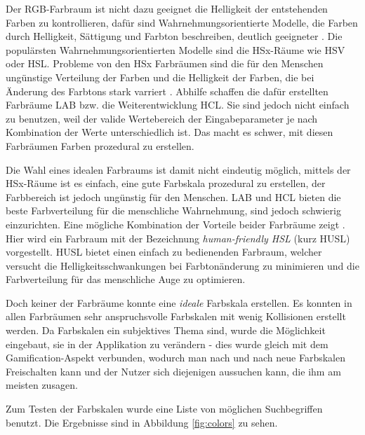 \documentclass[12pt,twoside]{book}
\begin{document}
Der RGB-Farbraum ist nicht dazu geeignet die Helligkeit der entstehenden Farben zu kontrollieren, dafür sind Wahrnehmungsorientierte Modelle, die Farben durch Helligkeit, Sättigung und Farbton beschreiben, deutlich geeigneter \cite{meier2004interactive}. Die populärsten Wahrnehmungsorientierten Modelle sind die HSx-Räume wie HSV oder HSL.
Probleme von den HSx Farbräumen sind die für den Menschen ungünstige Verteilung der Farben und die Helligkeit der Farben, die bei Änderung des Farbtons stark varriert \cite{husl}.
Abhilfe schaffen die dafür erstellten Farbräume LAB bzw. die Weiterentwicklung HCL. Sie sind jedoch nicht einfach zu benutzen, weil der valide Wertebereich der Eingabeparameter je nach Kombination der Werte unterschiedlich ist. Das macht es schwer, mit diesen Farbräumen Farben prozedural zu erstellen.

Die Wahl eines idealen Farbraums ist damit nicht eindeutig möglich, mittels der HSx-Räume ist es einfach, eine gute Farbskala prozedural zu erstellen, der Farbbereich ist jedoch ungünstig für den Menschen. LAB und HCL bieten die beste Farbverteilung für die menschliche Wahrnehmung, sind jedoch schwierig einzurichten. Eine mögliche Kombination der Vorteile beider Farbräume zeigt \citep{husl}. Hier wird ein Farbraum mit der Bezeichnung \textit{human-friendly HSL} (kurz HUSL) vorgestellt. HUSL bietet einen einfach zu bedienenden Farbraum, welcher versucht die Helligkeitsschwankungen bei Farbtonänderung zu minimieren und die Farbverteilung für das menschliche Auge zu optimieren.

Doch keiner der Farbräume konnte eine \textit{ideale} Farbskala erstellen. Es konnten in allen Farbräumen sehr anspruchsvolle Farbskalen mit wenig Kollisionen erstellt werden. Da Farbskalen ein subjektives Thema sind, wurde die Möglichkeit eingebaut, sie in der Applikation zu verändern - dies wurde gleich mit dem Gamification-Aspekt verbunden, wodurch man nach und nach neue Farbskalen Freischalten kann und der Nutzer sich diejenigen aussuchen kann, die ihm am meisten zusagen.

Zum Testen der Farbskalen wurde eine Liste von möglichen Suchbegriffen benutzt. Die Ergebnisse sind in Abbildung \ref{fig:colors} zu sehen.
\end{document}
